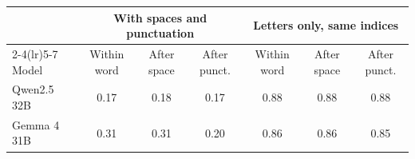 \begin{tabular}{l ccc ccc}
\toprule
& \multicolumn{3}{c}{With spaces and punctuation} & \multicolumn{3}{c}{Letters only, same indices} \\
\cmidrule(lr){2-4}\cmidrule(lr){5-7}
Model & Within word & After space & After punct. & Within word & After space & After punct. \\
\midrule
Qwen2.5 32B & 0.17 & 0.18 & 0.17 & 0.88 & 0.88 & 0.88 \\
Gemma 4 31B & 0.31 & 0.31 & 0.20 & 0.86 & 0.86 & 0.85 \\
\bottomrule
\end{tabular}
